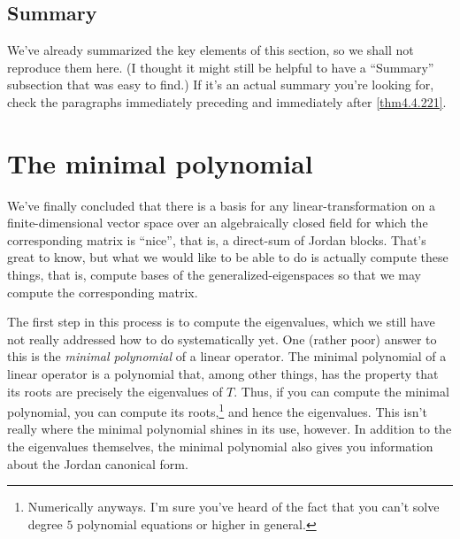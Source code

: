 \subsection{Summary}

We've already summarized the key elements of this section, so we shall not reproduce them here.  (I thought it might still be helpful to have a ``Summary'' subsection that was easy to find.)  If it's an actual summary you're looking for, check the paragraphs immediately preceding and immediately after \cref{thm4.4.221}.

\section{The minimal polynomial}

We've finally concluded that there is a basis for any linear-transformation on a finite-dimensional vector space over an algebraically closed field for which the corresponding matrix is ``nice'', that is, a direct-sum of Jordan blocks.  That's great to know, but what we would like to be able to do is actually compute these things, that is, compute bases of the generalized-eigenspaces so that we may compute the corresponding matrix.

The first step in this process is to compute the eigenvalues, which we still have not really addressed how to do systematically yet.  One (rather poor) answer to this is the \emph{minimal polynomial} of a linear operator.  The minimal polynomial of a linear operator is a polynomial that, among other things, has the property that its roots are precisely the eigenvalues of $T$.  Thus, if you can compute the minimal polynomial, you can compute its roots,\footnote{Numerically anyways.  I'm sure you've heard of the fact that you can't solve degree $5$ polynomial equations or higher in general.} and hence the eigenvalues.  This isn't really where the minimal polynomial shines in its use, however.  In addition to the the eigenvalues themselves, the minimal polynomial also gives you information about the Jordan canonical form.

